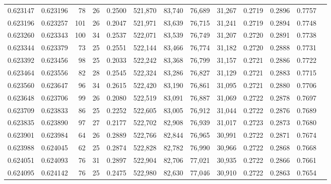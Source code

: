 \begin{tabular}{rrrrrrrrrrrrr}
0.623147 & 0.623196 &  78 &  26 &                                     0.2500 & 521,870 &  83,740 &  76,689 &  31,267 & 0.2719 & 0.2896 & 0.7757 \\
0.623196 & 0.623257 & 101 &  26 &                                     0.2047 & 521,971 &  83,639 &  76,715 &  31,241 & 0.2719 & 0.2894 & 0.7748 \\
0.623260 & 0.623343 & 100 &  34 &                                     0.2537 & 522,071 &  83,539 &  76,749 &  31,207 & 0.2720 & 0.2891 & 0.7738 \\
0.623344 & 0.623379 &  73 &  25 &                                     0.2551 & 522,144 &  83,466 &  76,774 &  31,182 & 0.2720 & 0.2888 & 0.7731 \\
0.623392 & 0.623456 &  98 &  25 &                                     0.2033 & 522,242 &  83,368 &  76,799 &  31,157 & 0.2721 & 0.2886 & 0.7722 \\
0.623464 & 0.623556 &  82 &  28 &                                     0.2545 & 522,324 &  83,286 &  76,827 &  31,129 & 0.2721 & 0.2883 & 0.7715 \\
0.623560 & 0.623647 &  96 &  34 &                                     0.2615 & 522,420 &  83,190 &  76,861 &  31,095 & 0.2721 & 0.2880 & 0.7706 \\
0.623648 & 0.623706 &  99 &  26 &                                     0.2080 & 522,519 &  83,091 &  76,887 &  31,069 & 0.2722 & 0.2878 & 0.7697 \\
0.623709 & 0.623833 &  86 &  25 &                                     0.2252 & 522,605 &  83,005 &  76,912 &  31,044 & 0.2722 & 0.2876 & 0.7689 \\
0.623835 & 0.623890 &  97 &  27 &                                     0.2177 & 522,702 &  82,908 &  76,939 &  31,017 & 0.2723 & 0.2873 & 0.7680 \\
0.623901 & 0.623984 &  64 &  26 &                                     0.2889 & 522,766 &  82,844 &  76,965 &  30,991 & 0.2722 & 0.2871 & 0.7674 \\
0.623988 & 0.624045 &  62 &  25 &                                     0.2874 & 522,828 &  82,782 &  76,990 &  30,966 & 0.2722 & 0.2868 & 0.7668 \\
0.624051 & 0.624093 &  76 &  31 &                                     0.2897 & 522,904 &  82,706 &  77,021 &  30,935 & 0.2722 & 0.2866 & 0.7661 \\
0.624095 & 0.624142 &  76 &  25 &                                     0.2475 & 522,980 &  82,630 &  77,046 &  30,910 & 0.2722 & 0.2863 & 0.7654 \\

\end{tabular}
